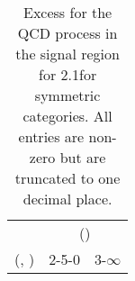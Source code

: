 \begin{table}[h!]
\tiny
\centering
\caption{Excess for the QCD process in the signal region for 2.1\ifb for symmetric categories. All entries are non-zero but are truncated to one decimal place.\label{tab:excesssepnaive_sig_qcd_sym}}
\begin{tabular}
{ccc}
	\hline\hline
	& \multicolumn{2}{c}{\scalht (\gev)} \\ 
	 (\njet,  \nb) & 2-5-0 & 3-$\infty$ \\ [0.8ex] 
\hline
	\hline
	\hline
\end{tabular}
\end{table}
